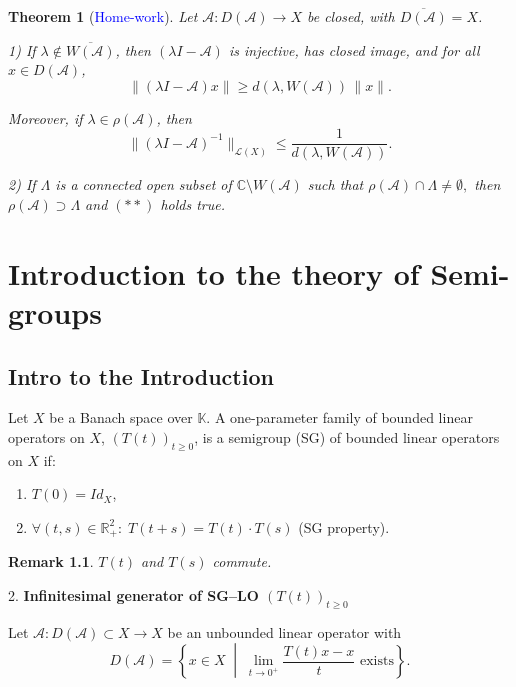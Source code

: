 \documentclass[12pt, oneside]{book}
\newtheorem{remark}{Remark}[section]
\newtheorem{theo}{Theorem}[section]
\begin{document}
\begin{theo}[\textcolor{blue}{Home-work}]
Let
$
\mathscr{A} : D(\mathscr{A}) \longrightarrow X
$
be closed, with $\overline{D(\mathscr{A})} = X$.

\medskip

1) If $\lambda \notin \overline{W(\mathscr{A})}$, then $(\lambda I - \mathscr{A})$ is injective,
has closed image, and
for all $x \in D(\mathscr{A})$,
\[
\|(\lambda I - \mathscr{A})x\|
\ge d(\lambda, W(\mathscr{A})) \, \|x\|.
\]

\medskip

Moreover, if $\lambda \in \rho(\mathscr{A})$, then
\[
\|(\lambda I - \mathscr{A})^{-1}\|_{\mathcal{L}(X)}
\le \frac{1}{d(\lambda, W(\mathscr{A}))}.
\tag{$**$}
\]

\medskip

2) If $\Lambda$ is a connected open subset of
$\mathbb{C} \setminus W(\mathscr{A})$
such that
$
\rho(\mathscr{A}) \cap \Lambda \neq \emptyset,
$
then
$
\rho(\mathscr{A}) \supset \Lambda
$
and $(**)$ holds true.	
\end{theo}


\chapter{Introduction to the theory of Semi-groups}
\section{Intro to the Introduction}
\begin{definition}
	Let $X$ be a Banach space over $\mathbb{K}$. A one-parameter family of bounded linear operators on $X$, $(T(t))_{t \geq 0}$, is a semigroup (SG) of bounded linear operators on $X$ if:
	
	\begin{enumerate}
		\item $T(0)=Id_X$,
		\item $\forall (t,s)\in \mathbb{R}_+^2 : \; T(t+s)=T(t)\cdot T(s)$ \hfill (SG property).
	\end{enumerate}
\end{definition}
\begin{remark}
$T(t)$ and $T(s)$ commute.	
\end{remark}

2. \textbf{Infinitesimal generator of SG--LO $(T(t))_{t \geq 0}$}
	
	Let
	$\mathscr{A} : D(\mathscr{A})\subset X \longrightarrow X$ be an unbounded linear operator with
	\[
	D(\mathscr{A})=\left\{ x\in X \; \middle| \; 
	\lim_{t\to 0^+}\frac{T(t)x-x}{t} \text{ exists} \right\}.
	\]
	
\end{document}
